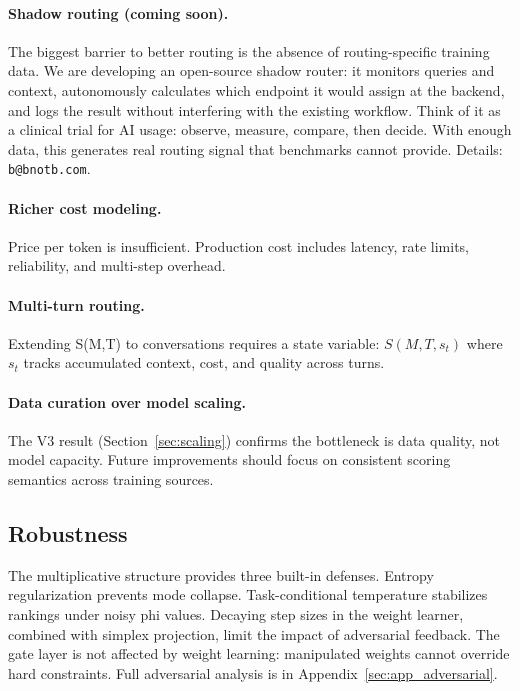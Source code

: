\paragraph{Shadow routing (coming soon).} The biggest barrier to better routing is the absence of routing-specific training data. We are developing an open-source shadow router: it monitors queries and context, autonomously calculates which endpoint it would assign at the backend, and logs the result without interfering with the existing workflow. Think of it as a clinical trial for AI usage: observe, measure, compare, then decide. With enough data, this generates real routing signal that benchmarks cannot provide. Details: \texttt{b@bnotb.com}.

\paragraph{Richer cost modeling.} Price per token is insufficient. Production cost includes latency, rate limits, reliability, and multi-step overhead.

\paragraph{Multi-turn routing.} Extending S(M,T) to conversations requires a state variable: $S(M, T, s_t)$ where $s_t$ tracks accumulated context, cost, and quality across turns.

\paragraph{Data curation over model scaling.} The V3 result (Section~\ref{sec:scaling}) confirms the bottleneck is data quality, not model capacity. Future improvements should focus on consistent scoring semantics across training sources.

\subsection{Robustness}

The multiplicative structure provides three built-in defenses. Entropy regularization prevents mode collapse. Task-conditional temperature stabilizes rankings under noisy phi values. Decaying step sizes in the weight learner, combined with simplex projection, limit the impact of adversarial feedback. The gate layer is not affected by weight learning: manipulated weights cannot override hard constraints. Full adversarial analysis is in Appendix~\ref{sec:app_adversarial}.

